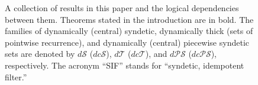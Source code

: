 \documentclass[letter,11pt]{article}
\theoremstyle{plain}
\theoremstyle{definition}
\theoremstyle{plain}
\theoremstyle{plain}
\numberwithin{equation}{section}
\newcommand{\dsyndetic}{d\mathcal{S}}
\newcommand{\dthick}{d\mathcal{T}}
\newcommand{\dcsyndetic}{dc\mathcal{S}}
\newcommand{\dcthick}{dc\mathcal{T}}
\newcommand{\PS}{\mathcal{PS}}
\newcommand{\dPS}{d\mathcal{PS}}
\newcommand{\dcPS}{dc\mathcal{PS}}
\newcommand{\central}{\mathcal{C}}
\newcommand{\classcap}{\sqcap}
\begin{document}
\begin{figure}[ht]
{
    }

    \caption{A collection of results in this paper and the logical dependencies between them. Theorems stated in the introduction are in bold.  The families of dynamically (central) syndetic, dynamically thick (sets of pointwise recurrence), and dynamically (central) piecewise syndetic sets are denoted by $\dsyndetic$ ($\dcsyndetic$), $\dthick$ ($\dcthick$), and $\dPS$ ($\dcPS$), respectively.  The acronym ``SIF'' stands for ``syndetic, idempotent filter.''}
    \label{fig_main_results}
\end{figure}
\end{document}
